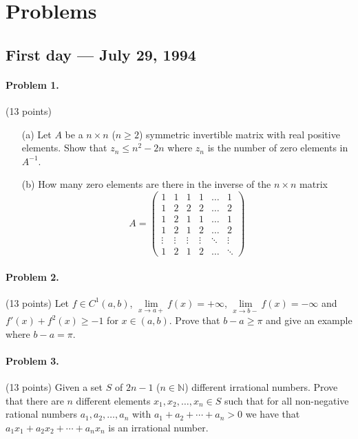 \documentclass{article}
\begin{document}
\pagestyle{plain}

\section*{Problems}

\subsection*{First day — July 29, 1994}

\paragraph{Problem 1.} (13 points)
\begin{enumerate}
    \item[(a)] Let $A$ be a $n \times n$ ($n \geq 2$) symmetric invertible matrix with real positive elements. Show that $z_n \leq n^2 - 2n$ where $z_n$ is the number of zero elements in $A^{-1}$.
    \item[(b)] How many zero elements are there in the inverse of the $n \times n$ matrix
    \[
    A = \begin{pmatrix}
    1 & 1 & 1 & 1 & \dots & 1 \\
    1 & 2 & 2 & 2 & \dots & 2 \\
    1 & 2 & 1 & 1 & \dots & 1 \\
    1 & 2 & 1 & 2 & \dots & 2 \\
    \vdots & \vdots & \vdots & \vdots & \ddots & \vdots \\
    1 & 2 & 1 & 2 & \dots & \ddots
    \end{pmatrix}
    \]
\end{enumerate}

\paragraph{Problem 2.} (13 points)
Let $f \in C^1(a, b)$, $\lim\limits_{x \to a+} f(x) = +\infty$,
$\lim\limits_{x \to b-} f(x) = -\infty$
and $f'(x) + f^2(x) \geq -1$ for $x \in (a, b)$. Prove that $b - a \geq \pi$ and give an example where $b - a = \pi$.

\paragraph{Problem 3.} (13 points) Given a set $S$ of $2n - 1$ ($n \in \mathbb{N}$) different irrational numbers. Prove that there are $n$ different elements $x_1, x_2, \ldots, x_n \in S$ such that for all non-negative rational numbers $a_1, a_2, \ldots, a_n$ with $a_1 + a_2 + \cdots + a_n > 0$ we have that $a_1x_1 + a_2x_2 + \cdots + a_nx_n$ is an irrational number.
\end{document}
